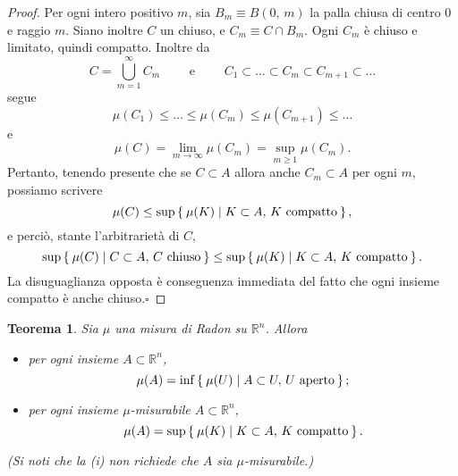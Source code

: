 \documentclass[a4paper,10pt,openright,oneside]{book}
\theoremstyle{theoremstyle}
\newtheorem{teorema}{Teorema}[section]
\theoremstyle{theoremstylewoheader}
\theoremstyle{theoremstyle}
\theoremstyle{proofsecstyle}
\theoremstyle{nonumberplain}
\newtheorem{proof}{Dim.}
\newcommand{\RR}{\ensuremath{\mathbb{R}}}
\renewcommand{\qedsymbol}{\ensuremath{\square}}
\newcommand{\qed}{\unskip\nobreak\hfill\nobreak\hspace{.5em}\qedsymbol}
\begin{document}
\begin{proof}
Per ogni intero positivo $m$, sia $B_m \equiv B(0,\, m)$ la palla chiusa di centro 0 e raggio $m$. Siano inoltre $C$ un chiuso, e $C_m \equiv C \cap B_m$. Ogni $C_m$ è chiuso e limitato, quindi compatto. Inoltre da
\[
C = \bigcup_{m=1}^\infty C_m \qquad\text{ e }\qquad C_1 \subset \ldots \subset C_m \subset C_{m+1} \subset \ldots
\]
segue
\[
\mu(C_1) \le \ldots \le \mu(C_m) \le \mu(C_{m+1}) \le \ldots
\]
e
\[
\mu(C) = \lim_{m \to \infty} \mu(C_m) = \sup_{m \ge 1} \mu(C_m).
\]
Pertanto, tenendo presente che se $C \subset A$ allora anche $C_m \subset A$ per ogni $m$, possiamo scrivere
\[
\mu(C) \le \sup\Set{ \mu(K) | K \subset A,\, K \text{ compatto} },
\]
e perciò, stante l'arbitrarietà di $C$,
\[
\sup\Set{ \mu(C) | C \subset A,\, C \text{ chiuso} } \le \sup\Set{ \mu(K) | K \subset A,\, K \text{ compatto} }.
\]
La disuguaglianza opposta è conseguenza immediata del fatto che ogni insieme compatto è anche chiuso.\qed
\end{proof}

\begin{teorema}
\label{thm:approssimazione_con_aperti_e_compatti}
Sia $\mu$ una misura di Radon su $\RR^n$. Allora
\begin{itemize}
\item[(i)] per ogni insieme $A \subset \RR^n$,
\[
\mu(A) = \inf\Set{ \mu(U) | A \subset U,\, U \text{ aperto} };
\]
\item[(ii)] per ogni insieme \emph{$\mu$-misurabile} $A \subset \RR^n$,
\[
\mu(A) = \sup\Set{ \mu(K) | K \subset A,\, K \text{ compatto} }.
\]
\end{itemize}
(Si noti che la (i) non richiede che $A$ sia $\mu$-misurabile.)
\end{teorema}
\end{document}
